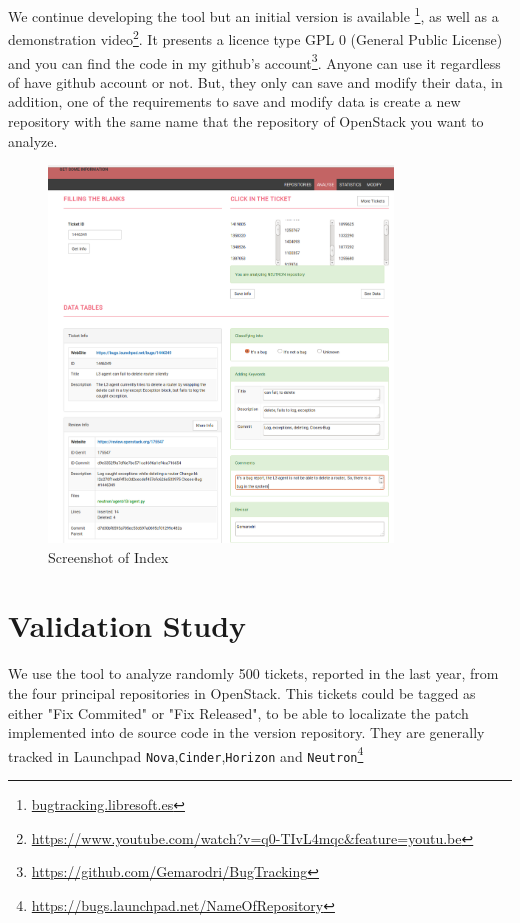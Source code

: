 \documentclass[ifip]{svmult}
\begin{document}
We continue developing the tool but an initial version is available \footnote{\url{bugtracking.libresoft.es}}, as well as a demonstration video\footnote{\url{https://www.youtube.com/watch?v=q0-TIvL4mqc&feature=youtu.be}}. It presents a licence type GPL 0 (General Public License) and you can find the code in my github's account\footnote{\url{https://github.com/Gemarodri/BugTracking}}. Anyone can use it regardless of have github account or not. But, they only can save and modify their data, in addition, one of the requirements to save and modify data is create a new repository with the same name that the repository of OpenStack you want to analyze. 

\begin{figure}
\centering
\includegraphics[height=10cm]{index.png}
\caption{Screenshot of Index}
\label{fig:2}       %
\end{figure}
\section{Validation Study} 
\label{sec:3}

We use the tool to analyze randomly 500 tickets, reported in the last year, from the four principal repositories in OpenStack. This tickets could be tagged as either "Fix Commited" or "Fix Released", to be able to localizate the patch implemented into de source code in the version repository. They are generally tracked in Launchpad \texttt{Nova},\texttt{Cinder},\texttt{Horizon} and \texttt{Neutron}\footnote{\url{https://bugs.launchpad.net/NameOfRepository}}
\end{document}
